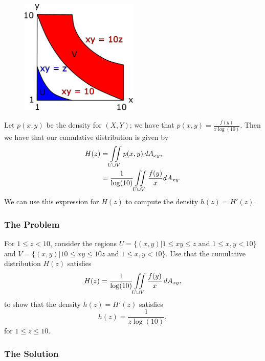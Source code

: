 \begin{figure}[h]
\centering
\includegraphics[width = 0.5\textwidth]{multiVarIntCalc/significandProduct.pdf}
\end{figure}

Let \(p(x,y)\) be the density for \((X, Y)\); we have that \(p(x,y) = \frac{f(y)}{x\log(10)}\). Then we have that our cumulative distribution is given by
\begin{align}
H(z) & = \iint\limits_{U\cup V} p(x,y) \, dA_{xy}, \\ 
& = \frac{1}{\log(10)} \iint \limits_{U\cup V} \frac{f(y)}{x}  dA_{xy}.
\end{align}
We can use this expression for \(H(z)\) to compute the density \(h(z) = H'(z)\).

\subsubsection*{The Problem}

For \(1 \leq z < 10\), consider the regions \(U = \{(x, y) | 1 \leq xy \leq z \text{ and } 1 \leq x, y < 10 \}\) and \(V = \{(x, y) | 10 \leq xy \leq 10z \text{ and } 1 \leq x, y < 10\}\). Use that the
cumulative distribution \(H(z)\) satisfies 
\begin{equation}
H(z) = \frac{1}{\log(10)} \iint\limits_{U \cup V} \frac{f(y)}{x} \, dA_{xy}, 
\end{equation}
to show that the density \(h(z) = H'(z)\) satisfies
\begin{equation}
h(z) = \frac{1}{z\log(10)},
\end{equation}
for \(1 \leq z \leq 10\).

\subsubsection*{The Solution}

